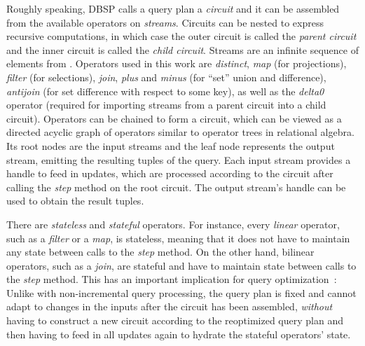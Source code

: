 
Roughly speaking, DBSP calls a query plan a \emph{circuit}
and it can be assembled from the available operators on \emph{streams}.
Circuits can be nested to express recursive computations, in which case
the outer circuit is called the \emph{parent circuit} and the inner circuit
is called the \emph{child circuit}.
Streams are an infinite sequence of elements from \zsets{}.
Operators used in this work are \emph{distinct},
\emph{map} (for projections), \emph{filter} (for selections),
\emph{join}, \emph{plus} and \emph{minus} (for ``set'' union and difference),
\emph{antijoin} (for set difference with respect to some key),
as well as the \emph{delta0} operator (required for importing streams
from a parent circuit into a child circuit).
Operators can be chained to form a circuit, which can be viewed as
a directed acyclic graph of operators similar to operator trees in relational algebra.
Its root nodes are the input streams and the leaf node represents the output
stream, emitting the resulting tuples of the query.
Each input stream provides a handle to feed in updates, which are processed
according to the circuit after calling the \emph{step} method on the root
circuit.
The output stream's handle can be used to obtain the result tuples.

There are \emph{stateless} and \emph{stateful} operators.
For instance, every \emph{linear} operator, such as a \emph{filter} or a \emph{map},
is stateless, meaning that it does not have to maintain any state between
calls to the \emph{step} method.
On the other hand, bilinear operators, such as a \emph{join}, are stateful
and have to maintain state between calls to the \emph{step} method.
This has an important implication for query optimization~\cite{budiu2025dbsp}:
Unlike with non-incremental query processing, the query plan is fixed and cannot
adapt to changes in the inputs after the circuit has been assembled,
\emph{without} having to construct a new circuit according to the
reoptimized query plan and then having to feed in all updates again
to hydrate the stateful operators' state.

